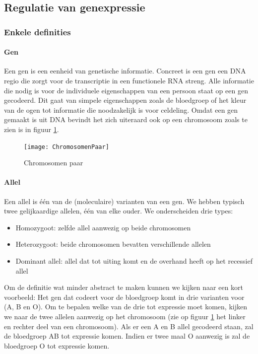 \documentclass[a4paper,kul]{kulakarticle} %
\begin{document}
\subsection{Regulatie van genexpressie}

\subsubsection{Enkele definities}
\paragraph{Gen}
Een gen is een eenheid van genetische informatie. Concreet is een gen een DNA regio die zorgt voor de transcriptie in een functionele RNA streng. Alle informatie die nodig is voor de individuele eigenschappen van een persoon staat op een gen gecodeerd. Dit gaat van simpele eigenschappen zoals de bloedgroep of het kleur van de ogen tot informatie die noodzakelijk is voor celdeling. Omdat een gen gemaakt is uit DNA bevindt het zich uiteraard ook op een chromosoom zoals te zien is in figuur \ref{fig:chromosomenpaar}.
\begin{figure}[h]
	\centering
	\texttt{[image: ChromosomenPaar]}
	\caption[Chromosomen paar]{Chromosomen paar}
	\label{fig:chromosomenpaar}
\end{figure}
\newpage
\paragraph{Allel}
Een allel is één van de (moleculaire) varianten van een gen. We hebben typisch twee gelijkaardige allelen, één van elke ouder. We onderscheiden drie types:
\begin{itemize}
	\item Homozygoot: zelfde allel aanwezig op beide chromosomen
	\item Heterozygoot: beide chromosomen bevatten verschillende allelen
	\item Dominant allel: allel dat tot uiting komt en de overhand heeft op het recessief allel
\end{itemize}
Om de definitie wat minder abstract te maken kunnen we kijken naar een kort voorbeeld: Het gen dat codeert voor de bloedgroep komt in drie varianten voor (A, B en O). Om te bepalen welke van de drie tot expressie moet komen, kijken we naar de twee allelen aanwezig op het chromosoom (zie op figuur \ref{fig:chromosomenpaar} het linker en rechter deel van een chromosoom). Als er een A en B allel gecodeerd staan, zal de bloedgroep AB tot expressie komen. Indien er twee maal O aanwezig is zal de bloedgroep O tot expressie komen. 
\end{document}
